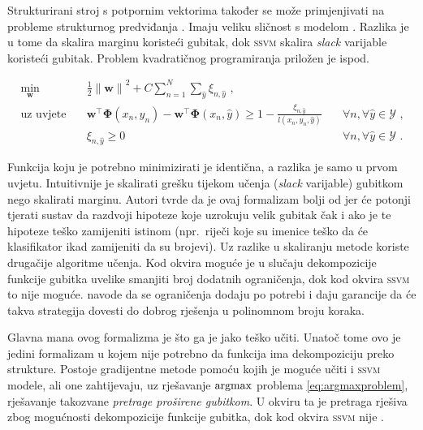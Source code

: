 Strukturirani stroj s potpornim vektorima  također se može primjenjivati na probleme strukturnog
predviđanja \citep{tsochantaridis2005large}. Imaju veliku sličnost s modelom
\mmmm{}. Razlika je u tome da \mmmm{} skalira marginu koristeći gubitak, dok
\textsc{ssvm} skalira \textit{slack} varijable koristeći gubitak. Problem
kvadratičnog programiranja priložen je ispod.

\begin{equation}\label{eq:ssvm}
\begin{aligned}
  \min_{\mathbf{w}} & \quad \frac{1}{2} {\lVert\mathbf{w}\lVert}^2 + C \sum_{n=1}^{N}\sum_{\hat{y}} \xi_{n,\hat{y}} \text{ ,}              & \\
  \text{uz uvjete}  & \quad \mathbf{w}^\top \mathbf{\Phi}(x_n, y_n) - \mathbf{w}^\top \mathbf{\Phi}(x_n, \hat{y}) \ge 1 - \frac{\xi_{n,\hat{y}}}{l(x_n, y_n, \hat{y})} & \quad \forall n, \forall \hat{y} \in \mathcal{Y} \text{ ,}\\
                    & \quad \xi_{n,\hat{y}} \ge 0                                                                                          & \quad \forall n, \forall \hat{y} \in \mathcal{Y} \text{ .}
\end{aligned}
\end{equation}

\noindent
Funkcija koju je potrebno minimizirati je identična, a razlika je samo u prvom
uvjetu. Intuitivnije je skalirati grešku tijekom učenja (\textit{slack}
varijable) gubitkom nego skalirati marginu. Autori tvrde da je ovaj formalizam
bolji od \mmmm{} jer će potonji tjerati sustav da razdvoji hipoteze koje
uzrokuju velik gubitak čak i ako je te hipoteze teško zamijeniti istinom
(npr.~riječi koje su imenice teško da će klasifikator ikad zamijeniti da su
brojevi). Uz razlike u skaliranju metode koriste drugačije algoritme učenja. Kod
\mmmm{} okvira moguće je u slučaju dekompozicije funkcije gubitka uvelike
smanjiti broj dodatnih ograničenja, dok kod okvira \textsc{ssvm} to nije moguće.
\citet{tsochantaridis2005large} navode da se ograničenja dodaju po potrebi i
daju garancije da će takva strategija dovesti do dobrog rješenja u polinomnom
broju koraka.

Glavna mana ovog formalizma je što ga je jako teško učiti. Unatoč tome ovo je
jedini formalizam u kojem nije potrebno da funkcija ima dekompoziciju preko
strukture. Postoje gradijentne metode pomoću kojih je moguće učiti \mmmm{} i
\textsc{ssvm} modele, ali one zahtijevaju, uz rješavanje $\operatorname*{argmax}$ problema
\ref{eq:argmaxproblem}, rješavanje takozvane \textit{pretrage proširene
gubitkom}. U \mmmm{} okviru ta je pretraga rješiva zbog mogućnosti dekompozicije
funkcije gubitka, dok kod okvira \textsc{ssvm} nije \citep{ratliff2006maximum}.
